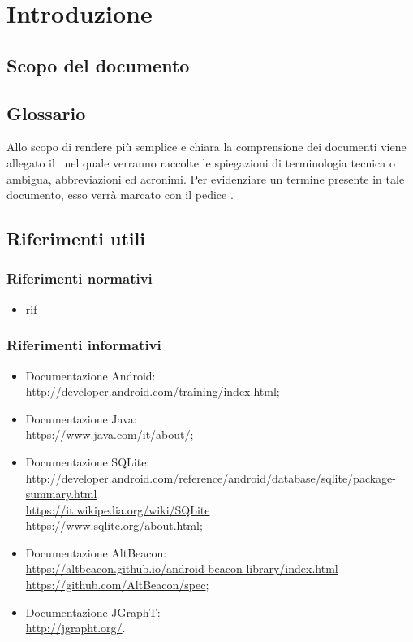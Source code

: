 \documentclass[../SpecificaTecnica.tex]{subfiles}
\begin{document}
\section{Introduzione}
	\subsection{Scopo del documento}
	
	\subsection{Glossario} \label{sec:Glossario}
	Allo scopo di rendere più semplice e chiara la comprensione dei documenti viene allegato il \glossariov\ nel quale verranno raccolte le spiegazioni di  terminologia tecnica o  ambigua,
	abbreviazioni ed acronimi. Per evidenziare un termine presente in tale documento, esso verrà marcato con il pedice \g.
	\subsection{Riferimenti utili}
		\subsubsection{Riferimenti normativi}
		\begin{itemize}
			\item rif
		\end{itemize}
		\subsubsection{Riferimenti informativi}
		\begin{itemize}
			\item Documentazione Android: \\ \url{http://developer.android.com/training/index.html};
			\item Documentazione Java: \\ \url{https://www.java.com/it/about/};
			\item Documentazione SQLite: \\ \url{http://developer.android.com/reference/android/database/sqlite/package-summary.html} \\ \url{https://it.wikipedia.org/wiki/SQLite} \\ \url{https://www.sqlite.org/about.html};
			\item Documentazione AltBeacon: \\ \url{https://altbeacon.github.io/android-beacon-library/index.html} \\ \url{https://github.com/AltBeacon/spec};
			\item Documentazione JGraphT: \\ \url{http://jgrapht.org/}.
			
		\end{itemize}
\end{document}

